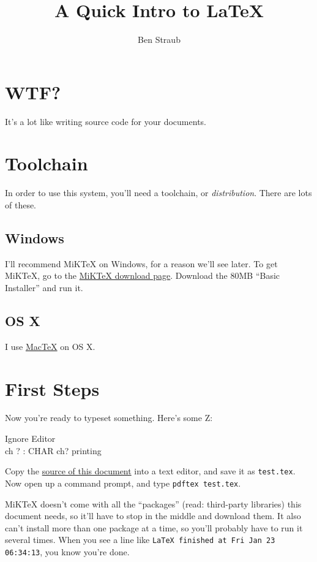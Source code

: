 \documentclass[11pt]{article}
\begin{document}
\title{A Quick Intro to \LaTeX}
\author{Ben Straub}
\maketitle

\section{WTF?}

It's a lot like writing source code for your documents.

\section{Toolchain}

In order to use this system, you'll need a toolchain, or \textit{distribution}.  There are lots of
these.

\subsection{Windows}
I'll recommend MiKTeX on Windows, for a reason we'll see later.  To get MiKTeX, go to the
{\color{blue} \href{http://miktex.org/2.7/setup}{MiKTeX download page}}.  Download the 80MB ``Basic
Installer'' and run it.

\subsection{OS X}
I use {\color{blue} \href{http://www.tug.org/mactex/}{MacTeX}} on OS X.


\section{First Steps}
Now you're ready to typeset something.  Here's some Z:

\begin{schema}{Ignore}
  \Xi Editor \\
  ch ? : CHAR
  \where
  ch? \notin printing 
\end{schema}

Copy the {\color{blue} \href{http://www.straubnet.net/LatexIntro.tex}{source of this document}} into
a text editor, and save it as \texttt{test.tex}. Now open up a command prompt, and type
\texttt{pdftex test.tex}.

MiKTeX doesn't come with all the ``packages'' (read: third-party libraries) this document needs, so
it'll have to stop in the middle and download them.  It also can't install more than one package at
a time, so you'll probably have to run it several times. When you see a line like \texttt{LaTeX
  finished at Fri Jan 23 06:34:13}, you know you're done.
\end{document}
